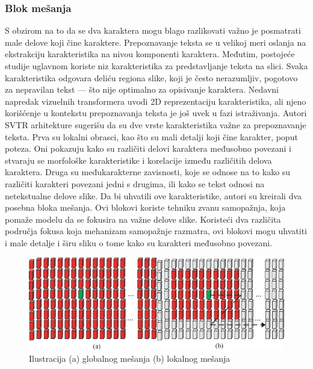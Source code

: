 \documentclass[a4paper,12pt]{article}
\begin{document}
	\subsubsection{Blok mešanja}
	S obzirom na to da se dva karaktera mogu blago razlikovati važno je posmatrati male delove koji čine karaktere. Prepoznavanje teksta se u velikoj meri oslanja na ekstrakciju karakteristika na nivou komponenti karaktera. Međutim, postojeće studije uglavnom koriste niz karakteristika za predstavljanje teksta na slici. Svaka karakteristika odgovara deliću regiona slike, koji je često nerazumljiv, pogotovo za nepravilan tekst — što nije optimalno za opisivanje karaktera. Nedavni napredak vizuelnih transformera uvodi 2D reprezentaciju karakteristika, ali njeno korišćenje u kontekstu prepoznavanja teksta je još uvek u fazi istraživanja. Autori SVTR arhitekture sugerišu da su dve vrste karakteristika važne za prepoznavanje teksta. Prva su lokalni obrasci, kao što su mali detalji koji čine karakter, poput poteza. Oni pokazuju kako su različiti delovi karaktera međusobno povezani i stvaraju se morfološke karakteristike i korelacije između različitih delova karaktera. Druga su međukarakterne zavisnosti, koje se odnose na to kako su različiti karakteri povezani jedni s drugima, ili kako se tekst odnosi na netekstualne delove slike. Da bi uhvatili ove karakteristike, autori su kreirali dva posebna bloka mešanja. Ovi blokovi koriste tehniku zvanu samopažnja, koja pomaže modelu da se fokusira na važne delove slike. Koristeći dva različita područja fokusa koja mehanizam samopažnje razmatra, ovi blokovi mogu uhvatiti i male detalje i širu sliku o tome kako su karakteri međusobno povezani.
	
	\begin{figure}[H]
		\centering
		\includegraphics[width=\textwidth]{assets/mixing-illustration.png}
		\caption{Ilustracija (a) globalnog mešanja (b) lokalnog mešanja}
		\label{fig:mixing-illustration}
	\end{figure}
	
\end{document}
